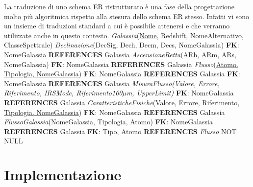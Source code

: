 \documentclass[12pt,a4paper,onecolumn,x11names]{article}
\begin{document}
	\begin{flushleft}
		La traduzione di uno schema ER ristrutturato è una fase della progettazione molto più algoritmica rispetto alla stesura dello schema ER stesso. Infatti vi sono un insieme di traduzioni standard a cui è possibile attenersi e che verranno utilizzate anche in questo contesto.\newline\newline		
		\textsf{\textit{Galassia}(\underline{Nome}, Redshift, NomeAlternativo, ClasseSpettrale)}\newline
		\textsf{\textit{Declinazione}(DecSig, Dech, Decm, Decs, NomeGalassia)}\newline
		\textsf{\textbf{FK}: NomeGalassia \textbf{REFERENCES} Galassia}\newline
		\textsf{\textit{AscensioneRetta}(ARh, ARm, ARs, NomeGalassia)}\newline
		\textsf{\textbf{FK}: NomeGalassia \textbf{REFERENCES} Galassia}\newline
		\textsf{\textit{Flusso}(\underline{Atomo, Tipologia, NomeGalassia})}\newline
		\textsf{\textbf{FK}: NomeGalassia \textbf{REFERENCES} Galassia}\newline
		\textsf{\textbf{FK}: NomeGalassia \textbf{REFERENCES} Galassia}\newline
		\textsf{\textit{MisuraFlusso(Valore, Errore, Riferimento, IRSMode, Riferimento160$\mu$m, UpperLimit)}}\newline
		\textsf{\textbf{FK}: NomeGalassia \textbf{REFERENCES} Galassia}\newline
		\textsf{\textit{CaratteristicheFisiche}(Valore, Errore, Riferimento, \underline{Tipologia, NomeGalassia})}\newline
		\textsf{\textbf{FK}: NomeGalassia \textbf{REFERENCES} Galassia}\newline\newline		
		\textsf{\textit{FlussoGalassia}(NomeGalassia, Tipologia, Atomo)}\newline
		\textsf{\textbf{FK}: NomeGalassia \textbf{REFERENCES} Galassia}\newline
		\textsf{\textbf{FK}: Tipo, Atomo \textbf{REFERENCES} \textit{Flusso} NOT NULL}
	\end{flushleft}

\newpage
\section{Implementazione}
\end{document}
